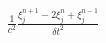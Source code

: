 \documentclass[preview]{standalone}
\begin{document}
\begin{align*}
\frac{1}{c^2}\frac{\xi_{j}^{n+1} - 2 \xi_{j}^{n} + \xi_{j}^{n-1}}{\delta t^2}
\end{align*}
\end{document}
